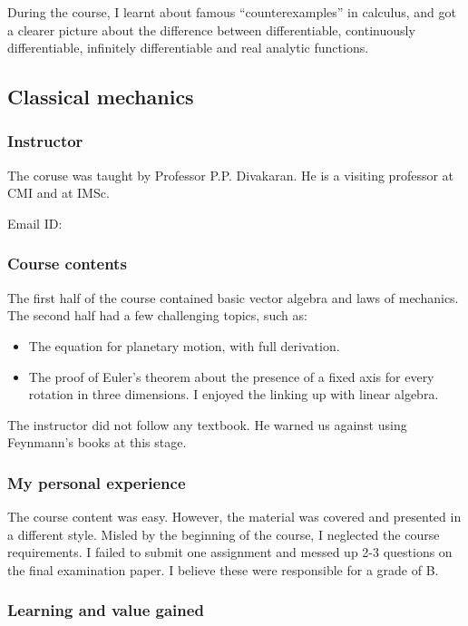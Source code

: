 \documentclass[a4paper]{amsart}
\begin{document}
During the course, I learnt about famous ``counterexamples'' in calculus,
and got a clearer picture about the difference between differentiable, continuously differentiable,
infinitely differentiable and real analytic functions.


\subsection{Classical mechanics}\label{classmech}

\subsubsection{Instructor}

The coruse was taught by Professor P.P. Divakaran. He is a visiting  
professor at CMI and at IMSc.

Email ID: 

\subsubsection{Course contents}

The first half of the course contained basic vector algebra and laws of 
mechanics. The second half had a few challenging topics, such as:

\begin{itemize}
\item The equation for planetary motion, with full derivation.
\item The proof of Euler's theorem about the presence 
  of a fixed axis for every rotation in three 
  dimensions. I enjoyed the linking up with linear algebra.
\end{itemize}

The instructor did not follow any textbook. He warned us against using
Feynmann's books at this stage.
\subsubsection{My personal experience}

The course content was easy. However, the material was covered and presented in
a different style. Misled by the beginning of the course, I neglected the course requirements.
I failed to submit one assignment and 
messed up 2-3 questions on the final examination
paper. I believe these were responsible for a grade of B. 

\subsubsection{Learning and value gained}
\end{document}
